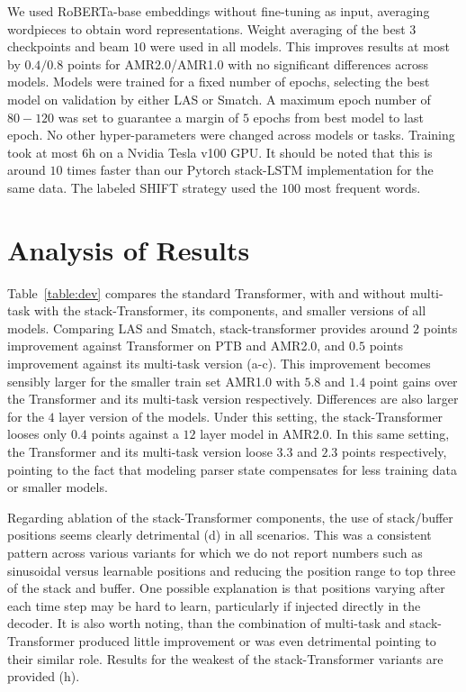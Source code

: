 \documentclass[11pt,a4paper]{article}
\begin{document}
We used RoBERTa-base \cite{liu2019roberta} embeddings without fine-tuning as input, averaging wordpieces to obtain word representations. Weight averaging of the best $3$ checkpoints \cite{junczys-dowmunt-etal-2016-amu} and beam $10$ were used in all models. This improves results at most by $0.4/0.8$ points for AMR2.0/AMR1.0 with no significant differences across models. Models were trained for a fixed number of epochs, selecting the best model on validation by either LAS or Smatch. A maximum epoch number of $80-120$ was set to guarantee a margin of $5$ epochs from best model to last epoch. No other hyper-parameters were changed across models or tasks. Training took at most $6$h on a Nvidia Tesla v100 GPU. It should be noted that this is around $10$ times faster than our Pytorch stack-LSTM implementation for the same data. The labeled SHIFT strategy used the $100$ most frequent words. 

\section{Analysis of Results}
\label{section:results}


Table~\ref{table:dev} compares the standard Transformer, with and without multi-task with the stack-Transformer, its components, and smaller versions of all models. Comparing LAS and Smatch, stack-transformer provides around $2$ points improvement against Transformer on PTB and AMR2.0, and $0.5$ points improvement against its multi-task version (a-c). This improvement becomes sensibly larger for the smaller train set AMR1.0 with $5.8$ and $1.4$ point gains over the Transformer and its multi-task version respectively. Differences are also larger for the $4$ layer version of the models. Under this setting, the stack-Transformer looses only $0.4$ points against a $12$ layer model in AMR2.0. In this same setting, the Transformer and its multi-task version loose $3.3$ and $2.3$ points respectively, pointing to the fact that modeling parser state compensates for less training data or smaller models.

Regarding ablation of the stack-Transformer components, the use of stack/buffer positions seems clearly detrimental (d) in all scenarios. This was a consistent pattern across various variants for which we do not report numbers such as sinusoidal versus learnable positions and reducing the position range to top three of the stack and buffer. One possible explanation is that positions varying after each time step may be hard to learn, particularly if injected directly in the decoder. It is also worth noting, than the combination of multi-task and stack-Transformer produced little improvement or was even detrimental pointing to their similar role. Results for the weakest of the stack-Transformer variants are provided (h).
\end{document}
